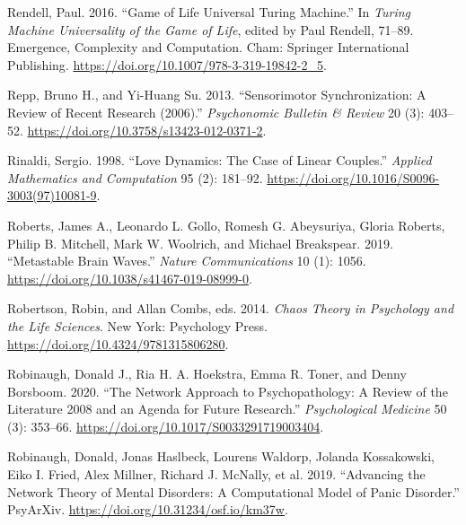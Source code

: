 \documentclass[
  letterpaper,
]{scrbook}
\newlength{\cslhangindent}
\newlength{\cslentryspacingunit} %
\newenvironment{CSLReferences}[2] %
 {%
  \setlength{\parindent}{0pt}
  \ifodd #1
  \let\oldpar\par
  \def\par{\hangindent=\cslhangindent\oldpar}
  \fi
  \setlength{\parskip}{#2\cslentryspacingunit}
 }%
 {}
\begin{document}
\begin{CSLReferences}{1}{0}
\leavevmode{}%
Rendell, Paul. 2016. {``Game of {Life Universal Turing Machine}.''} In
\emph{Turing {Machine Universality} of the {Game} of {Life}}, edited by
Paul Rendell, 71--89. Emergence, {Complexity} and {Computation}. {Cham}:
{Springer International Publishing}.
\url{https://doi.org/10.1007/978-3-319-19842-2_5}.

\leavevmode{}%
Repp, Bruno H., and Yi-Huang Su. 2013. {``Sensorimotor Synchronization:
{A} Review of Recent Research (2006).''}
\emph{Psychonomic Bulletin \& Review} 20 (3): 403--52.
\url{https://doi.org/10.3758/s13423-012-0371-2}.

\leavevmode{}%
Rinaldi, Sergio. 1998. {``Love Dynamics: {The} Case of Linear
Couples.''} \emph{Applied Mathematics and Computation} 95 (2): 181--92.
\url{https://doi.org/10.1016/S0096-3003(97)10081-9}.

\leavevmode{}%
Roberts, James A., Leonardo L. Gollo, Romesh G. Abeysuriya, Gloria
Roberts, Philip B. Mitchell, Mark W. Woolrich, and Michael Breakspear.
2019. {``Metastable Brain Waves.''} \emph{Nature Communications} 10 (1):
1056. \url{https://doi.org/10.1038/s41467-019-08999-0}.

\leavevmode{}%
Robertson, Robin, and Allan Combs, eds. 2014. \emph{Chaos Theory in
{Psychology} and the {Life Sciences}}. {New York}: {Psychology Press}.
\url{https://doi.org/10.4324/9781315806280}.

\leavevmode{}%
Robinaugh, Donald J., Ria H. A. Hoekstra, Emma R. Toner, and Denny
Borsboom. 2020. {``The Network Approach to Psychopathology: A Review of
the Literature 2008 and an Agenda for Future
Research.''} \emph{Psychological Medicine} 50 (3): 353--66.
\url{https://doi.org/10.1017/S0033291719003404}.

\leavevmode{}%
Robinaugh, Donald, Jonas Haslbeck, Lourens Waldorp, Jolanda Kossakowski,
Eiko I. Fried, Alex Millner, Richard J. McNally, et al. 2019.
{``Advancing the {Network Theory} of {Mental Disorders}: {A
Computational Model} of {Panic Disorder}.''} {PsyArXiv}.
\url{https://doi.org/10.31234/osf.io/km37w}.


\end{CSLReferences}
\end{document}
